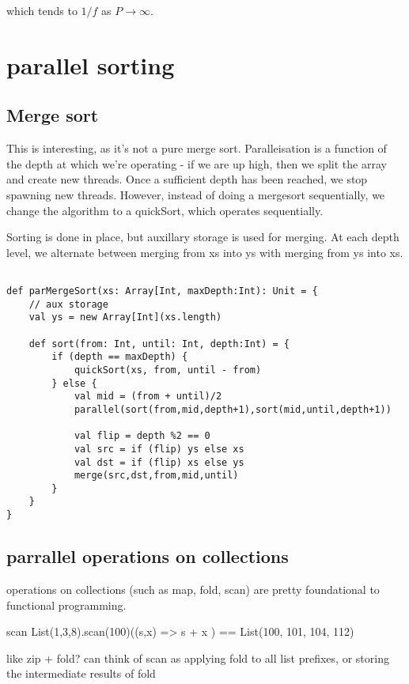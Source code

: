 which tends to $1/f$ as $P \rightarrow \infty$.


\section{parallel sorting}

\subsection{Merge sort}
This is interesting, as it's not a pure merge sort. Paralleisation is a function of the depth at which we're operating - if we are up high, then we split the array and create new threads. Once a sufficient depth has been reached, we stop spawning new threads. However, instead of doing a mergesort sequentially, we change the algorithm to a quickSort, which operates sequentially.

Sorting is done in place, but auxillary storage is used for merging. At each depth level, we alternate between merging from xs into ys with merging from ys into xs.

\begin{lstlisting}

def parMergeSort(xs: Array[Int, maxDepth:Int): Unit = {
    // aux storage
    val ys = new Array[Int](xs.length)

    def sort(from: Int, until: Int, depth:Int) = {
        if (depth == maxDepth) {
            quickSort(xs, from, until - from)
        } else {
            val mid = (from + until)/2
            parallel(sort(from,mid,depth+1),sort(mid,until,depth+1))

            val flip = depth %2 == 0
            val src = if (flip) ys else xs
            val dst = if (flip) xs else ys
            merge(src,dst,from,mid,until)
        }
    }
}
\end{lstlisting}

\subsection{parrallel operations on collections}

operations on collections (such as map, fold, scan) are pretty foundational to functional programming.

scan 
List(1,3,8).scan(100)((s,x) => s + x ) == List(100, 101, 104, 112)

like zip + fold? can think of scan as applying fold to all list prefixes, or storing the intermediate results of fold

